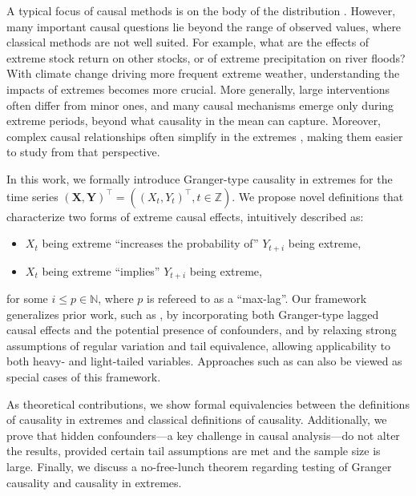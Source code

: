 \documentclass[a4paper,11pt]{article}
\begin{document}
A typical focus of causal methods is on the body of the distribution \citep[causality in the mean,][]{GRANGER1980329, PCalgorithm, Runge2019PCMCI}. However, many important causal questions lie beyond the range of observed values, where classical methods are not well suited. For example, what are the effects of extreme stock return \citep{Candelon2013} on other stocks, or of extreme precipitation \citep{barbero2018temperature} on river floods? With climate change driving more frequent extreme weather, understanding the impacts of extremes becomes more crucial. More generally, large interventions often differ from minor ones, and many causal mechanisms emerge only during extreme periods, beyond what causality in the mean can capture. Moreover, complex causal relationships often simplify in the extremes \citep{engelke2025extremesstructuralcausalmodels}, making them easier to study from that perspective.

In this work, we formally introduce Granger-type causality in extremes for the time series
\((\mathbf X,\mathbf Y)^\top=((X_t,Y_t)^\top,t\in\mathbb Z)\). We propose novel
definitions that characterize two forms of extreme causal effects, intuitively described as: 
\begin{itemize} %
    \item $X_t$ being extreme ``increases the probability of'' $Y_{t+i}$ being extreme,
    \item $X_t$ being extreme ``implies''  $Y_{t+i}$ being extreme,
\end{itemize}
for some $i\leq p \in \mathbb{N}$, where $p$ is refereed to as a ``max-lag''. 
Our framework generalizes prior work, such as \cite{Gnecco, Pasche, bodik}, by incorporating both Granger-type lagged causal effects and the potential presence of confounders, and by relaxing strong assumptions of regular variation and tail equivalence, allowing applicability to both heavy- and light-tailed variables. 
Approaches such as \cite{hong2009granger, Candelon2013, Mazzarisi_causality_in_tail} can also be viewed as special cases of this framework.


As theoretical contributions, we show formal equivalencies between the definitions of causality in extremes and classical definitions of causality. Additionally, we prove that hidden confounders---a key challenge in causal analysis---do not alter the results, provided certain tail assumptions are met and the sample size is large. Finally, we discuss a no-free-lunch theorem regarding testing of Granger causality and causality in extremes. 
\end{document}
